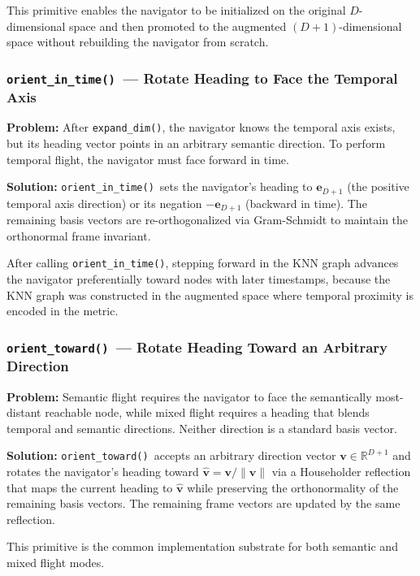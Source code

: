 \documentclass[12pt,letterpaper]{article}
\newcommand{\expanddim}{\texttt{expand\_dim()}}
\newcommand{\orientintime}{\texttt{orient\_in\_time()}}
\newcommand{\orienttoward}{\texttt{orient\_toward()}}
\begin{document}
This primitive enables the navigator to be initialized on the original
$D$-dimensional space and then promoted to the augmented $(D+1)$-dimensional
space without rebuilding the navigator from scratch.

\subsubsection{\orientintime\ --- Rotate Heading to Face the Temporal Axis}

\textbf{Problem:} After \expanddim, the navigator knows the temporal axis
exists, but its heading vector points in an arbitrary semantic direction. To
perform temporal flight, the navigator must face forward in time.

\textbf{Solution:} \orientintime\ sets the navigator's heading to
$\mathbf{e}_{D+1}$ (the positive temporal axis direction) or its negation
$-\mathbf{e}_{D+1}$ (backward in time). The remaining basis vectors are
re-orthogonalized via Gram-Schmidt to maintain the orthonormal frame invariant.

After calling \orientintime, stepping forward in the KNN graph advances the
navigator preferentially toward nodes with later timestamps, because the KNN
graph was constructed in the augmented space where temporal proximity is
encoded in the metric.

\subsubsection{\orienttoward\ --- Rotate Heading Toward an Arbitrary Direction}

\textbf{Problem:} Semantic flight requires the navigator to face the
semantically most-distant reachable node, while mixed flight requires a
heading that blends temporal and semantic directions. Neither direction is a
standard basis vector.

\textbf{Solution:} \orienttoward\ accepts an arbitrary direction vector
$\mathbf{v} \in \mathbb{R}^{D+1}$ and rotates the navigator's heading toward
$\hat{\mathbf{v}} = \mathbf{v}/\|\mathbf{v}\|$ via a Householder reflection
that maps the current heading to $\hat{\mathbf{v}}$ while preserving the
orthonormality of the remaining basis vectors. The remaining frame vectors
are updated by the same reflection.

This primitive is the common implementation substrate for both semantic and
mixed flight modes.

\end{document}
